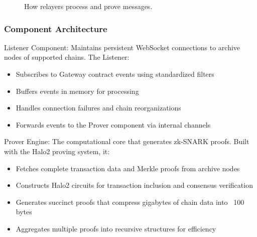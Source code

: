 \documentclass[11pt,a4paper]{article}
\begin{document}
\begin{figure}[H]
\centering
{}
\caption{How relayers process and prove messages.}
\end{figure}


\subsubsection*{Component Architecture}

Listener Component: Maintains persistent WebSocket connections to archive nodes of supported chains. The Listener:
\begin{itemize}
    \item Subscribes to Gateway contract events using standardized filters
    \item Buffers events in memory for processing
    \item Handles connection failures and chain reorganizations
    \item Forwards events to the Prover component via internal channels
\end{itemize}

Prover Engine: The computational core that generates zk-SNARK proofs. Built with the Halo2 proving system, it:
\begin{itemize}
    \item Fetches complete transaction data and Merkle proofs from archive nodes
    \item Constructs Halo2 circuits for transaction inclusion and consensus verification
    \item Generates succinct proofs that compress gigabytes of chain data into ~100 bytes
    \item Aggregates multiple proofs into recursive structures for efficiency
\end{itemize}
\end{document}
